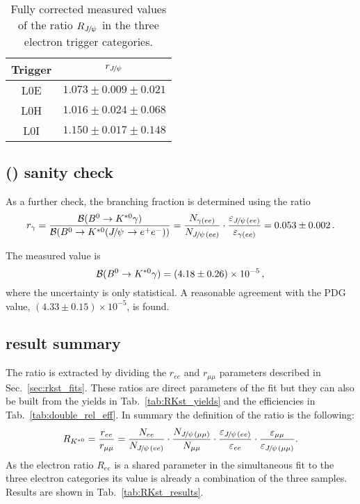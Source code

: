 \begin{table}[h!]
\centering
 \caption{Fully corrected measured values of the ratio
 $R_{\jpsi}$ in the three electron trigger categories. }
\begin{tabular}{c|c}

Trigger & $r_{\jpsi}$ \\
\hline
L0E & $ 1.073  \pm 0.009 \pm 0.021 $ \\
L0H & $ 1.016  \pm 0.024 \pm 0.068 $ \\
L0I & $ 1.150  \pm 0.017 \pm 0.148 $ \\

  \end{tabular}
 \label{tab:Rjpsi}
\end{table}

\subsection{\BR(\BdToKstG) sanity check}

As a further check, the \BdToKstG branching fraction is determined using the ratio
%
$$r_\gamma = \frac{\BR(\BdToKstG)} {\BR(\BdToKstJPsee)} = \frac{N_{\gamma(ee)}}{N_{\jpsi(ee)}} \cdot \frac{\varepsilon_{\jpsi(ee)}}{\varepsilon_{\gamma(ee)}} = 0.053 \pm 0.002 \, .$$

The measured value is
%
$${\cal B}({{B}^0}\rightarrow{\ensuremath{{K}^{*0}}}\gamma) = (4.18 \pm 0.26) \times 10^{-5} \, ,$$
%
\noindent where the uncertainty is only statistical.
A reasonable agreement with the PDG~\cite{PDG2014} value, $(4.33 \pm 0.15) \times 10^{-5}$, is found.


\subsection{\RKst result summary}

The ratio \RKst is extracted by dividing the $r_{ee}$ and $r_{\mu\mu}$
parameters described in Sec.~\ref{sec:rkst_fits}. These ratios are 
direct parameters of the fit but they can also be built from the yields
in Tab.~\ref{tab:RKst_yields} and the efficiencies in Tab.~\ref{tab:double_rel_eff}.
In summary the definition of the \RKst ratio is the following:
%
\begin{equation}
\RKst = \frac{r_{ee}}{r_{\mu\mu}}  
= \frac{N_{ee}}{N_{\jpsi(ee)}} 
\cdot \frac{N_{\jpsi(\mu\mu)}}{N_{\mu\mu}}
\cdot \frac{\varepsilon_{\jpsi(ee)}}{\varepsilon_{ee}} 
\cdot \frac{\varepsilon_{\mu\mu}}{\varepsilon_{\jpsi(\mu\mu)}}.
\end{equation}
%
As the electron ratio $R_{ee}$ is a shared parameter in the simultaneous fit to the
three electron categories its value is already a combination of the three samples.
Results are shown in Tab.~\ref{tab:RKst_results}.

